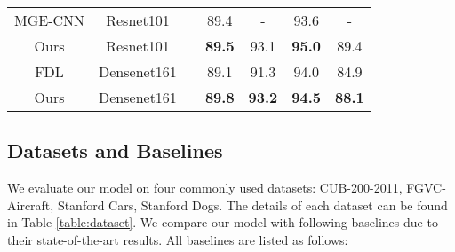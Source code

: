 \documentclass[conference]{IEEEtran}
\newcommand{\unchecked}{}
\begin{document}
\begin{table*}
\begin{tabular}{ccccccc}
			MGE-CNN       & Resnet101   &\unchecked     & 89.4   & - &93.6 & - \\
			Ours &Resnet101 &\checked    & \textbf{89.5}&93.1 &\textbf{95.0} &89.4\\ \hline
			FDL &Densenet161 &\checked &89.1 &91.3 &94.0 &84.9  \\
			Ours&Densenet161 &\checked    & \textbf{89.8}&\textbf{93.2} &\textbf{94.5} &\textbf{88.1}\\ \hline
		\end{tabular}
	\end{table*}
	\subsection{Datasets and Baselines}
	We evaluate our model on four commonly used datasets: CUB-200-2011\cite{CUB}, FGVC-Aircraft\cite{CRAFT}, Stanford Cars\cite{CAR}, Stanford Dogs\cite{DOG}. The details of each dataset can be found in Table \ref{table:dataset}. We compare our model with following baselines due to their state-of-the-art results. All baselines are listed as follows:
\end{document}
